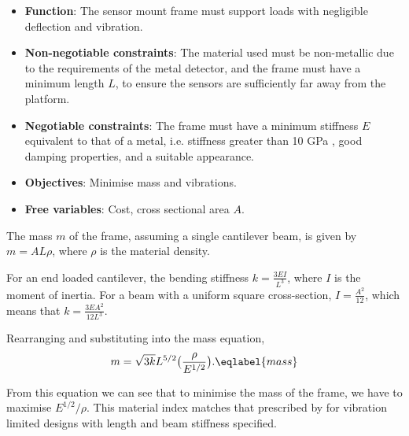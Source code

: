 \documentclass[main.tex]{subfiles}
\begin{document}
\begin{appendices}
\begin{itemize}
\item \textbf{Function}: The sensor mount frame must support loads with negligible deflection and vibration.
\item \textbf{Non-negotiable constraints}: The material used must be non-metallic due to the requirements of the metal detector, and the  frame must have a minimum length $L$, to ensure the sensors are sufficiently far away from the platform.
\item \textbf{Negotiable constraints}: The frame must have a minimum stiffness $E$ equivalent to that of a metal, i.e. stiffness greater than 10 GPa \parencite{Ashby11}, good damping properties, and a suitable appearance.
\item \textbf{Objectives}: Minimise mass and vibrations.
\item \textbf{Free variables}: Cost, cross sectional area $A$.
\end{itemize}

The mass $m$ of the frame, assuming a single cantilever beam, is given by $m=AL\rho$, where $\rho$ is the material density. 

For an end loaded cantilever, the bending stiffness $k=\frac{3EI}{L^3}$, where $I$ is the moment of inertia. For a beam with a uniform square cross-section, $I=\frac{A^2}{12}$, which means that $k=\frac{3EA^2}{12L^3}$.

Rearranging and substituting into the mass equation, 
\begin{align}
m=\sqrt{3k}L^{5/2}\big(\frac{\rho}{E^{1/2}}\big).	\eqlabel{mass}
\end{align}

From this equation we can see that to minimise the mass of the frame, we have to maximise $E^{1/2}/\rho$. This material index matches that prescribed by \textcite{Ashby11} for vibration limited designs with length and beam stiffness specified.  


\end{appendices}
\end{document}
